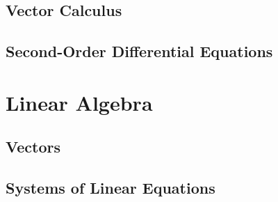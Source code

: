   \chapter{Vector Calculus}
    
    
    
    
    
    
    
    
    
    

  \chapter{Second-Order Differential Equations}
    
    
    
    


\setcounter{chapter}{0}
\part{Linear Algebra}
  \chapter{Vectors}
    
    
    
    

  \chapter{Systems of Linear Equations}
    
    
    
    
    

